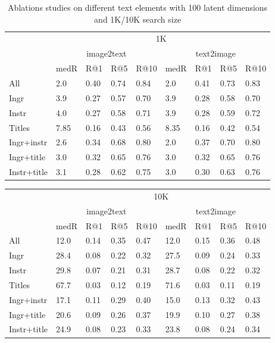 \documentclass[12pt, titlepage]{article}
\begin{document}
\begin{appendices}
\begin{table}[h]
\caption{Ablations studies on different text elements with 100 latent dimensions and 1K/10K search size}
\label{tab:diff-elements}
\centering
\begin{tabular}{|l|llll|llll|}
\hline
\toprule
& \multicolumn{8}{c|}{1K}\\ \cline{2-9}
& \multicolumn{4}{c|}{image2text} & \multicolumn{4}{|c|}{text2image}\\ \cline{2-9}
& medR   & R@1   & R@5   & R@10  & medR   & R@1   & R@5   & R@10 \\ \cline{1-9}
\midrule
All & 2.0 & 0.40 & 0.74 & 0.84 & 2.0 & 0.41 & 0.73 & 0.83 \\
Ingr & 3.9 & 0.27 & 0.57 & 0.70 & 3.9 & 0.28 & 0.58 & 0.70 \\
Instr & 4.0 & 0.27 & 0.58 & 0.71 & 3.9 & 0.28 & 0.59 & 0.72 \\
Titles & 7.85 & 0.16 & 0.43 & 0.56 & 8.35 & 0.16 & 0.42 & 0.54 \\
Ingr+instr & 2.6 & 0.34 & 0.68 & 0.80 & 2.0 & 0.37 & 0.70 & 0.80 \\
Ingr+title & 3.0 & 0.32 & 0.65 & 0.76 & 3.0 & 0.32 & 0.65 & 0.76 \\
Instr+title & 3.1 & 0.28 & 0.62 & 0.75 & 3.0 & 0.30 & 0.63 & 0.76 \\
\bottomrule
\hline
\end{tabular}
\end{table}

\begin{table}[h]
\centering
\begin{tabular}{|l|llll|llll|}
\hline
\toprule
& \multicolumn{8}{c|}{10K}\\ \cline{2-9}
& \multicolumn{4}{c|}{image2text} & \multicolumn{4}{|c|}{text2image}\\ \cline{2-9}
& medR   & R@1   & R@5   & R@10  & medR   & R@1   & R@5   & R@10 \\ \cline{1-9}
\midrule
All & 12.0 & 0.14 & 0.35 & 0.47 & 12.0 & 0.15 & 0.36 & 0.48 \\
Ingr & 28.4 & 0.08 & 0.22 & 0.32 & 27.5 & 0.09 & 0.24 & 0.33 \\
Instr & 29.8 & 0.07 & 0.21 & 0.31 & 28.7 & 0.08 & 0.22 & 0.32 \\
Titles & 67.7 & 0.03 & 0.12 & 0.19 & 71.6 & 0.03 & 0.11 & 0.19 \\
Ingr+instr & 17.1 & 0.11 & 0.29 & 0.40 & 15.0 & 0.13 & 0.32 & 0.43 \\
Ingr+title & 20.6 & 0.09 & 0.26 & 0.37 & 19.9 & 0.10 & 0.27 & 0.38 \\
Instr+title & 24.9 & 0.08 & 0.23 & 0.33 & 23.8 & 0.08 & 0.24 & 0.34 \\
\bottomrule
\hline
\end{tabular}
\end{table}

\end{appendices}

\newpage

\end{document}
